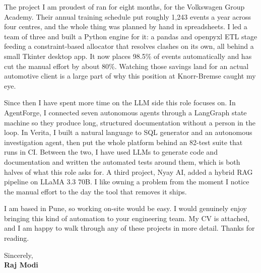 \documentclass[a4paper,11pt]{article}
\begin{document}
The project I am proudest of ran for eight months, for the Volkswagen Group Academy. Their annual
training schedule put roughly 1,243 events a year across four centres, and the whole thing was
planned by hand in spreadsheets. I led a team of three and built a Python engine for it: a pandas and
openpyxl ETL stage feeding a constraint-based allocator that resolves clashes on its own, all behind
a small Tkinter desktop app. It now places 98.5\% of events automatically and has cut the manual
effort by about 80\%. Watching those savings land for an actual automotive client is a large part of
why this position at Knorr-Bremse caught my eye.

Since then I have spent more time on the LLM side this role focuses on. In AgentForge, I connected
seven autonomous agents through a LangGraph state machine so they produce long, structured
documentation without a person in the loop. In Verita, I built a natural language to SQL generator
and an autonomous investigation agent, then put the whole platform behind an 82-test suite that runs
in CI. Between the two, I have used LLMs to generate code and documentation and written the automated
tests around them, which is both halves of what this role asks for. A third project, Nyay AI, added a
hybrid RAG pipeline on LLaMA 3.3 70B. I like owning a problem from the moment I notice the manual
effort to the day the tool that removes it ships.

I am based in Pune, so working on-site would be easy. I would genuinely enjoy bringing this kind of
automation to your engineering team. My CV is attached, and I am happy to walk through any of these
projects in more detail. Thanks for reading.

\vspace{4pt}
Sincerely,\\
\textbf{\color{HeaderDark}Raj Modi}
\end{document}
